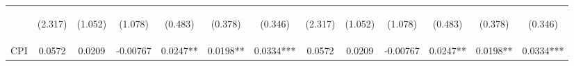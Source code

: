 \documentclass[]{article}
\begin{document}
\begin{center}
\begin{tabular}{lcccccccccccc}
\vspace{4pt} & \begin{footnotesize}(2.317)\end{footnotesize} & \begin{footnotesize}(1.052)\end{footnotesize} & \begin{footnotesize}(1.078)\end{footnotesize} & \begin{footnotesize}(0.483)\end{footnotesize} & \begin{footnotesize}(0.378)\end{footnotesize} & \begin{footnotesize}(0.346)\end{footnotesize} & \begin{footnotesize}(2.317)\end{footnotesize} & \begin{footnotesize}(1.052)\end{footnotesize} & \begin{footnotesize}(1.078)\end{footnotesize} & \begin{footnotesize}(0.483)\end{footnotesize} & \begin{footnotesize}(0.378)\end{footnotesize} & \begin{footnotesize}(0.346)\end{footnotesize} \\
CPI & 0.0572 & 0.0209 & -0.00767 & 0.0247** & 0.0198** & 0.0334*** & 0.0572 & 0.0209 & -0.00767 & 0.0247** & 0.0198** & 0.0334*** \\

\end{tabular}
\end{center}
\end{document}
